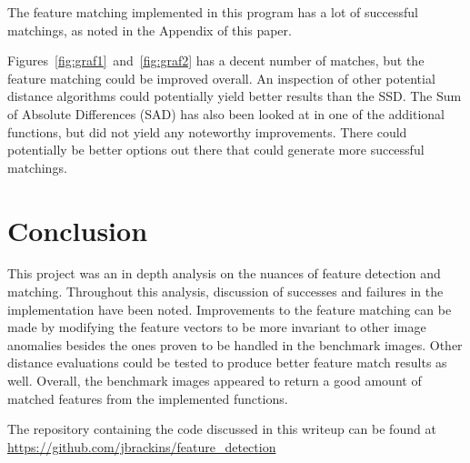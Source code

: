 \documentclass[12pt,journal,compsoc]{IEEEtran}
\begin{document}
The feature matching implemented in this program has a lot of successful matchings, as noted in the Appendix of this paper. 

Figures~\ref{fig:graf1}~and~\ref{fig:graf2} has a decent number of matches, but the feature matching could be improved overall. An inspection of other potential distance algorithms could potentially yield better results than the SSD. The Sum of Absolute Differences (SAD) has also been looked at in one of the additional functions, but did not yield any noteworthy improvements. There could potentially be better options out there that could generate more successful matchings.

\section{Conclusion}
This project was an in depth analysis on the nuances of feature detection and matching. Throughout this analysis, discussion of successes and failures in the implementation have been noted. Improvements to the feature matching can be made by modifying the feature vectors to be more invariant to other image anomalies besides the ones proven to be handled in the benchmark images. Other distance evaluations could be tested to produce better feature match results as well. Overall, the benchmark images appeared to return a good amount of matched features from the implemented functions.

The repository containing the code discussed in this writeup can be found at {\url{https://github.com/jbrackins/feature_detection}}

\clearpage




%
\end{document}
